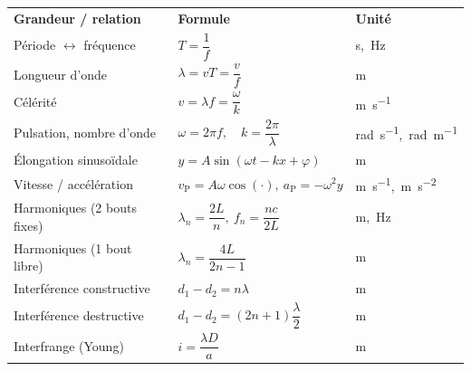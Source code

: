 \documentclass[11pt,a4paper]{article}
\begin{document}
\begin{center}
\renewcommand{\arraystretch}{1.45}
\begin{tabular}{>{\raggedright\arraybackslash}m{4.7cm}
                >{\centering\arraybackslash}m{5.4cm}
                >{\centering\arraybackslash}m{3.3cm}}
\rowcolor{primary!18}
\textbf{Grandeur / relation} & \textbf{Formule} & \textbf{Unité} \\
\rowcolor{primary!5}
Période $\leftrightarrow$ fréquence & $T = \dfrac{1}{f}$ & \si{\second},\ \si{\hertz} \\
Longueur d'onde & $\lambda = vT = \dfrac{v}{f}$ & \si{\metre} \\
\rowcolor{primary!5}
Célérité & $v = \lambda f = \dfrac{\omega}{k}$ & \si{\metre\per\second} \\
Pulsation, nombre d'onde & $\omega = 2\pi f,\quad k = \dfrac{2\pi}{\lambda}$
   & \si{\radian\per\second},\ \si{\radian\per\metre} \\
\rowcolor{primary!5}
Élongation sinusoïdale & $y = A\sin(\omega t - kx + \varphi)$ & \si{\metre} \\
Vitesse / accélération & $v_{\mathrm P}=A\omega\cos(\cdot),\ a_{\mathrm P}=-\omega^2 y$
   & \si{\metre\per\second},\ \si{\metre\per\second\squared} \\
\rowcolor{primary!5}
Harmoniques (2 bouts fixes) & $\lambda_n = \dfrac{2L}{n},\ f_n=\dfrac{nc}{2L}$
   & \si{\metre},\ \si{\hertz} \\
Harmoniques (1 bout libre) & $\lambda_n = \dfrac{4L}{2n-1}$ & \si{\metre} \\
\rowcolor{primary!5}
Interférence constructive & $d_1-d_2 = n\lambda$ & \si{\metre} \\
Interférence destructive & $d_1-d_2 = (2n+1)\dfrac{\lambda}{2}$ & \si{\metre} \\
\rowcolor{primary!5}
Interfrange (Young) & $i = \dfrac{\lambda D}{a}$ & \si{\metre} \\
\end{tabular}
\end{center}
\end{document}

